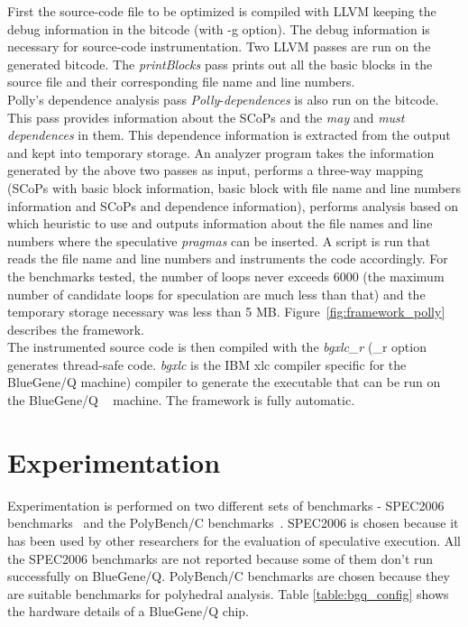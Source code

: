 \documentclass[10pt]{report}          %
\begin{document}
First the source-code file to be optimized is compiled with LLVM keeping the debug information in the bitcode (with -g option). The debug information is necessary for source-code instrumentation.  Two LLVM passes are run on the generated bitcode. The \textit{printBlocks} pass prints out all the basic blocks in the source file and their corresponding file name and line numbers.\\

Polly's dependence analysis pass \textit{Polly}-\textit{dependences} is also run on the bitcode.  This pass provides information about the SCoPs and the \textit{may} and \textit{must dependences} in them.  This dependence information is extracted from the output and kept into temporary storage.  An analyzer program takes the information generated by the above two passes as input, performs a three-way mapping (SCoPs with basic block information, basic block with file name and line numbers information and SCoPs and dependence information), performs analysis based on which heuristic to use and outputs information about the file names and line numbers where the speculative \textit{pragmas} can be inserted. A script is run that reads the file name and line numbers and instruments the code accordingly.  For the benchmarks tested, the number of loops never exceeds 6000 (the maximum number of candidate loops for speculation are much less than that) and the temporary storage necessary was less than 5 MB.  Figure~\ref{fig:framework_polly} describes the framework.\\

The instrumented source code is then compiled with the \textit{bgxlc\_r} (\_r option generates thread-safe code. \textit{bgxlc} is the IBM xlc compiler specific for the BlueGene/Q machine) compiler to generate the executable that can be run on the BlueGene/Q ~\cite{BGQ} machine.  The framework is fully automatic.

\section{Experimentation}

Experimentation is performed on two different sets of benchmarks - SPEC2006 benchmarks~\cite{spec}  and the PolyBench/C benchmarks~\cite{polybench}.  SPEC2006 is chosen because it has been used by other researchers for the evaluation of speculative execution. All the SPEC2006 benchmarks are not reported because some of them don't run successfully on BlueGene/Q.  PolyBench/C benchmarks are chosen because they are suitable benchmarks for polyhedral analysis.  Table \ref{table:bgq_config} shows the hardware details of a BlueGene/Q chip. \\
 
\end{document}
